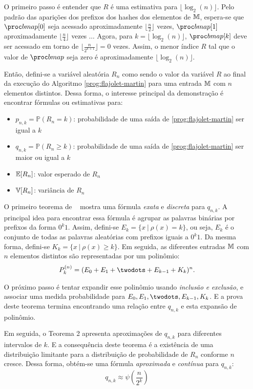 O primeiro passo é entender que $R$ é uma estimativa para $\lfloor \log_2(n) \rfloor$. Pelo padrão das aparições dos 
prefixos dos hashes dos elementos de $\mathbb{M}$, espera-se que $\bitmap[0]$ seja acessado aproximadamente $\lfloor 
\frac{n}{2} \rfloor$ vezes, $\bitmap[1]$ aproximadamente $\lfloor \frac{n}{4} \rfloor$ vezes $\dots$ Agora, para 
$k = \lfloor \log_2(n) \rfloor$, $\bitmap[k]$ deve ser acessado em torno de $\lfloor \frac{n}{2^{k+1}} \rfloor = 0$ 
vezes. Assim, o menor índice $R$ tal que o valor de $\bitmap$ seja zero é aproximadamente $\lfloor \log_2(n) \rfloor$.

Então, defini-se a variável aleatória $R_n$ como sendo o valor da variável $R$ ao final da execução do Algoritmo 
\ref{prog:flajolet-martin} para uma entrada $\mathbb{M}$ com $n$ elementos distintos. Dessa forma, o interesse principal 
da demonstração é encontrar fórmulas ou estimativas para:
\begin{itemize}
  \item $p_{n,k} = \mathbb{P}(R_n = k)$: probabilidade de uma saída de \ref{prog:flajolet-martin} ser igual a $k$
  \item $q_{n,k} = \mathbb{P}(R_n \geq k)$: probabilidade de uma saída de \ref{prog:flajolet-martin} 
  ser maior ou igual a $k$
  \item $\mathbb{E}[R_n]$: valor esperado de $R_n$
  \item $\mathbb{V}[R_n]$: variância de $R_n$
\end{itemize}

O primeiro teorema de ~\citep{flajolet:martin:85} mostra uma fórmula \textit{exata} e \textit{discreta} para $q_{n,k}$. 
A principal idea para encontrar essa fórmula é agrupar as palavras binárias por prefixos da forma $0^k1$. Assim, 
defini-se $E_k = \{ x  \ | \ \rho(x) = k \}$, ou seja, $E_k$ é o conjunto de todas as palavras aleatórias com prefixos
iguais a $0^k1$. Da mesma forma, defini-se $K_k = \{ x \ | \ \rho(x) \geq k \}$. Em seguida, as diferentes entradas 
$\mathbb{M}$ com $n$ elementos distintos são representadas por um polinômio:
\[ P_k^{(n)} = (E_0 + E_1 + \twodots + E_{k-1} + K_k)^n .\]

O próximo passo é tentar expandir esse polinômio usando \textit{inclusão e exclusão}, e associar uma medida 
probabilidade para $E_0, E_1, \twodots, E_{k-1}, K_k$. E a prova deste teorema termina encontrando uma relação entre 
$q_{n,k}$ e esta expansão de polinômio.

Em seguida, o Teorema 2 apresenta aproximações de $q_{n,k}$ para diferentes intervalos de $k$. E a consequência deste 
teorema é a existência de uma distribuição limitante para a distribuição de probabilidade de $R_n$ conforme $n$ cresce. 
Dessa forma, obtém-se uma fórmula \textit{aproximada} e \textit{contínua} para $q_{n,k}$:
\[ q_{n,k} \approx \psi(\frac{n}{2^k}) \]

